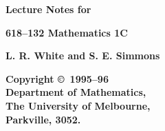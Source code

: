 \documentclass[12pt,a4paper]{article}
\begin{document}
\begin{titlepage}
\thispagestyle{empty}

\begin{center}
\mbox{}

\vfill

{\Large\bf Lecture Notes for}

\vfill

{\Huge\bf 618--132 \hspace{1.5cm} Mathematics 1C}

\vfill
\vfill

{\LARGE\bf L. R. White and S. E. Simmons }

\vfill
\vfill
\vfill

\mbox{}\hspace{2cm}\hfill
\begin{minipage}[b]{9cm}\begin{center}
\large\bf Copyright \copyright\ 1995--96 \\
\large\bf Department of Mathematics,\\
\large\bf The University of Melbourne,\\
\large\bf Parkville, 3052. 
\end{center}\end{minipage}
\hfill
\epsfxsize=2cm
\end{center}
\end{titlepage}
\end{document}
